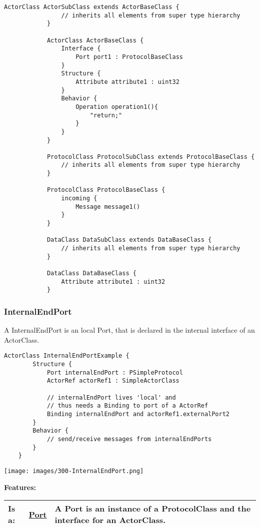 			\begin{lstlisting}[language=ROOM]
			ActorClass ActorSubClass extends ActorBaseClass {
				// inherits all elements from super type hierarchy
			}
			
			ActorClass ActorBaseClass {
				Interface {
					Port port1 : ProtocolBaseClass
				}
				Structure {
					Attribute attribute1 : uint32
				}
				Behavior {
					Operation operation1(){
						"return;"
					}
				}
			}
			
			ProtocolClass ProtocolSubClass extends ProtocolBaseClass {
				// inherits all elements from super type hierarchy
			}
			
			ProtocolClass ProtocolBaseClass {
				incoming {
					Message message1()
				}
			}
			
			DataClass DataSubClass extends DataBaseClass {
				// inherits all elements from super type hierarchy
			}
			
			DataClass DataBaseClass {
				Attribute attribute1 : uint32
			}
		\end{lstlisting}
	
	\vspace{\baselineskip}
	\vspace{\baselineskip}
	\vspace{\baselineskip}
	
\subsubsection{InternalEndPort}
	\hypertarget{ref:InternalEndPort}{}
	A InternalEndPort is an local Port, that is declared in the internal interface of an ActorClass.
		
	\begin{lstlisting}[language=ROOM]
	ActorClass InternalEndPortExample {
		Structure {
			Port internalEndPort : PSimpleProtocol
			ActorRef actorRef1 : SimpleActorClass
			
			// internalEndPort lives 'local' and
			// thus needs a Binding to port of a ActorRef
			Binding internalEndPort and actorRef1.externalPort2 
		}
		Behavior {
			// send/receive messages from internalEndPorts
		}
	}
	\end{lstlisting}
	\texttt{[image: images/300-InternalEndPort.png]}
		
		
	\begingroup
	\textbf{Features:}
	\renewcommand{\arraystretch}{1.8} %
	\begin{longtable}{l|l p{}}
		\hline
	Is a: & \tabitem \hyperlink{ref:Port}{Port}  & A Port is an instance of a ProtocolClass and the interface for an ActorClass.\\
	\hline
	\end{longtable}
	\endgroup
		
